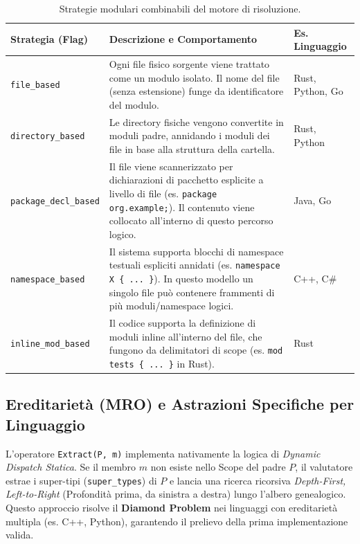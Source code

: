 \begin{table}[h!]
  \centering
  \begin{tabular}{|l|p{9cm}|l|}
    \hline
    \textbf{Strategia (Flag)} & \textbf{Descrizione e Comportamento}
    & \textbf{Es. Linguaggio} \\ \hline
    \texttt{file\_based} & Ogni file fisico sorgente viene trattato
    come un modulo isolato. Il nome del file (senza estensione) funge
    da identificatore del modulo. & Rust, Python, Go \\ \hline
    \texttt{directory\_based} & Le directory fisiche vengono
    convertite in moduli padre, annidando i moduli dei file in base
    alla struttura della cartella. & Rust, Python \\ \hline
    \texttt{package\_decl\_based} & Il file viene scannerizzato per
    dichiarazioni di pacchetto esplicite a livello di file (es.
    \texttt{package org.example;}). Il contenuto viene collocato
    all'interno di questo percorso logico. & Java, Go \\ \hline
    \texttt{namespace\_based} & Il sistema supporta blocchi di
    namespace testuali espliciti annidati (es. \texttt{namespace X \{
    ... \}}). In questo modello un singolo file può contenere
    frammenti di più moduli/namespace logici. & C++, C\# \\ \hline
    \texttt{inline\_mod\_based} & Il codice supporta la definizione
    di moduli inline all'interno del file, che fungono da
    delimitatori di scope (es. \texttt{mod tests \{ ... \}} in Rust).
    & Rust \\ \hline
  \end{tabular}
  \caption{Strategie modulari combinabili del motore di risoluzione.}
  \label{tab:module_strategies}
\end{table}

\subsection{Ereditarietà (MRO) e Astrazioni Specifiche per Linguaggio}
L'operatore \texttt{Extract(P, m)} implementa nativamente la logica
di \textit{Dynamic Dispatch Statica}. Se il membro $m$ non esiste
nello Scope del padre $P$, il valutatore estrae i
super-tipi (\texttt{super\_types}) di $P$ e lancia
una ricerca ricorsiva \textit{Depth-First, Left-to-Right} (Profondità
prima, da sinistra a destra) lungo l'albero genealogico.
Questo approccio risolve il \textbf{Diamond Problem} nei linguaggi
con ereditarietà multipla (es. C++, Python), garantendo il prelievo
della prima implementazione valida.


